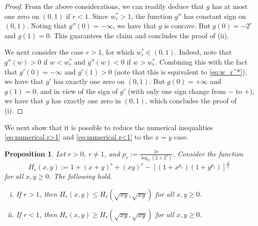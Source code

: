 \documentclass[reqno, 10pt]{amsart}
\theoremstyle{plain}
\numberwithin{equation}{section}
\newtheorem{proposition}[theorem]{Proposition}
\theoremstyle{definition}
\newtheorem*{induction hypothesis}{Induction hypothesis}
\theoremstyle{remark}
\newcommand{\db}[1]{{\color{blue}{[DB: #1]}}}
\begin{document}
\begin{proof}
From the above considerations, we can readily deduce that $g$ has at most one zero on $(0,1)$ if $r<1$. Since $w_r^*>1$, the function $g''$ has constant sign on $(0,1)$. Noting that $g''(0)=-\infty$, we have that $g$ is concave. But $g(0)=-2^r$ and $g(1)=0$. This guarantees the claim and concludes the proof of (ii). 

We next consider the case $r>1$, for which $w_r^* \in (0,1)$. Indeed, note that $g''(w)>0$ if $w < w_{r}^*$ and $g''(w)<0$ if $w > w_r^*$. 
Combining this with the fact that $g'(0)=-\infty$ and $g'(1)>0$ (note that this is equivalent to \eqref{eq:w_r^*}), we have that $g'$ has exactly one zero on $(0,1)$. %
But $g(0)=+\infty$ and $g(1)=0$, and in view of the sign of $g'$ (with only one sign change from $-$ to $+$), we have that $g$ has %
exactly one zero in $(0,1)$, which concludes the proof of (i).
\end{proof}

We next show that it is possible to reduce the numerical inequalities \eqref{eq:numerical r>1} and \eqref{eq:numerical r<1} to the $x=y$ case.


\begin{proposition}\label{prop:reduction to diagonal}
    Let $r>0$, $r \neq 1$, and $p_r:=\frac{2r}{\log_2(2+2^r)}$. Consider the function
    \begin{equation}\label{eq:H def}
        H_r(x,y) :=1 + (x+y)^r + (xy)^r - [(1+x^{p_r})(1+y^{p_r})]^{\frac{r}{p_r}} 
    \end{equation}
    for all $x,y \geq 0$. The following hold.
    \begin{enumerate}[(i)]
        \item If $r > 1$, then $H_r(x,y) \leq H_r(\sqrt{xy},\sqrt{xy})$ for all $x,y \geq 0$.
        \item If $r < 1$, then $H_r(x,y) \geq H_r(\sqrt{xy},\sqrt{xy})$ for all $x,y \geq 0$.
    \end{enumerate}
\end{proposition}
\end{document}
